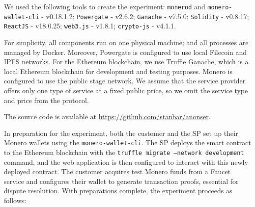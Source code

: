 \documentclass[pdftex,twocolumn,epjc3]{svjour3}
\begin{document}
We used the following tools to create the experiment:
\texttt{monerod} and \texttt{monero-wallet-cli} - v0.18.1.2; \texttt{Powergate} - v2.6.2; \texttt{Ganache} - v7.5.0; \texttt{Solidity} - v0.8.17; \texttt{ReactJS} - v18.0.25; \texttt{web3.js} - v1.8.1; \texttt{crypto-js} - v4.1.1.

For simplicity, all components run on one physical machine; and all processes are managed by Docker. 
Moreover, Powergate is configured to use local Filecoin and IPFS networks.
For the Ethereum blockchain, we use Truffle Ganache, which is a local Ethereum blockchain for development and testing purposes. 
Monero is configured to use the public stage network.
We assume that the service provider offers only one type of service at a fixed public price, so we omit the service type and price from the protocol.

The source code is available at \url{https://github.com/stanbar/anonser}.

In preparation for the experiment, both the customer and the SP set up their Monero wallets using the \texttt{monero-wallet-cli}. The SP deploys the smart contract to the Ethereum blockchain with the \texttt{truffle migrate --network development} command, and the web application is then configured to interact with this newly deployed contract.
The customer acquires test Monero funds from a Faucet service and configures their wallet to generate transaction proofs, essential for dispute resolution.
With preparations complete, the experiment proceeds as follows:
\end{document}
